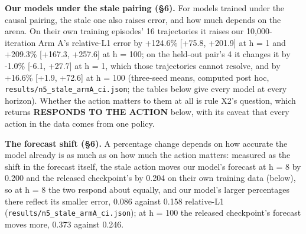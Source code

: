 \documentclass[10pt]{article}
\begin{document}
\textbf{Our models under the stale pairing (\S{}6).} For models trained under the causal pairing, the stale one also raises error, and how much depends on the arena. On their own training episodes' 16 trajectories it raises our 10,000-iteration Arm A's relative-L1 error by +124.6\% [+75.8, +201.9] at h = 1 and +209.3\% [+167.3, +257.6] at h = 100; on the held-out pair's 4 it changes it by -1.0\% [-6.1, +27.7] at h = 1, which those trajectories cannot resolve, and by +16.6\% [+1.9, +72.6] at h = 100 (three-seed means, computed post hoc, \texttt{results/\allowbreak{}n5\_\allowbreak{}stale\_\allowbreak{}armA\_\allowbreak{}ci\allowbreak{}.json}; the tables below give every model at every horizon). Whether the action matters to them at all is rule X2's question, which returns \textbf{RESPONDS TO THE ACTION} below, with its caveat that every action in the data comes from one policy.

\textbf{The forecast shift (\S{}6).} A percentage change depends on how accurate the model already is as much as on how much the action matters: measured as the shift in the forecast itself, the stale action moves our model's forecast at h = 8 by 0.200 and the released checkpoint's by 0.204 on their own training data (below), so at h = 8 the two respond about equally, and our model's larger percentages there reflect its smaller error, 0.086 against 0.158 relative-L1 (\texttt{results/\allowbreak{}n5\_\allowbreak{}stale\_\allowbreak{}armA\_\allowbreak{}ci\allowbreak{}.json}); at h = 100 the released checkpoint's forecast moves more, 0.373 against 0.246.
\end{document}
